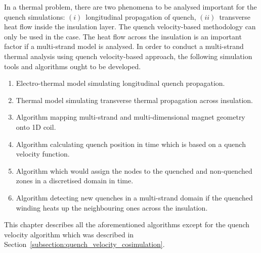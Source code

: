 
In a thermal problem, there are two phenomena to be analysed important for the quench simulations: $(i)$~longitudinal propagation of quench, $(ii)$~transverse heat flow inside the insulation layer. The quench velocity-based methodology can only be used in the  case. The heat flow across the insulation is an important factor if a multi-strand model is analysed. In order to conduct a multi-strand thermal analysis using quench velocity-based approach, the following simulation tools and algorithms ought to be developed.

\begin{enumerate}
\item Electro-thermal model simulating longitudinal quench propagation.
\item Thermal model simulating transverse thermal propagation across insulation.
\item Algorithm mapping multi-strand and multi-dimensional magnet geometry onto 1D coil.
\item Algorithm calculating quench position in time which is based on a quench velocity function.
\item Algorithm which would assign the nodes to the quenched and non-quenched zones in a discretised domain in time.
\item Algorithm detecting new quenches in a multi-strand domain if the quenched winding heats up the neighbouring ones across the insulation.
\end{enumerate}

This chapter describes all the aforementioned algorithms except for the quench velocity algorithm which was described in Section~\ref{subsection:quench_velocity_cosimulation}.